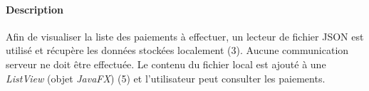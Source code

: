\paragraph{Description} Afin de visualiser la liste des paiements à effectuer, un lecteur de fichier JSON est utilisé et récupère les données stockées localement (3). Aucune communication serveur ne doit être effectuée. Le contenu du fichier local est ajouté à une \emph{ListView} (objet \emph{JavaFX}) (5) et l'utilisateur peut consulter les paiements.